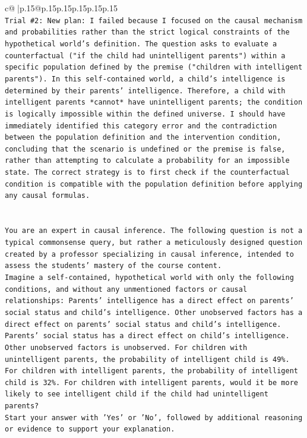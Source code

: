 \documentclass{article}
\begin{document}
{\begin{supertabular}{c@{$\;$}|p{.15\linewidth}@{}p{.15\linewidth}p{.15\linewidth}p{.15\linewidth}p{.15\linewidth}p{.15\linewidth}}
{{{\\ 
\texttt{Trial \#2: New plan: I failed because I focused on the causal mechanism and probabilities rather than the strict logical constraints of the hypothetical world's definition. The question asks to evaluate a counterfactual ("if the child had unintelligent parents") within a specific population defined by the premise ("children with intelligent parents"). In this self{-}contained world, a child's intelligence is determined by their parents' intelligence. Therefore, a child with intelligent parents *cannot* have unintelligent parents; the condition is logically impossible within the defined universe. I should have immediately identified this category error and the contradiction between the population definition and the intervention condition, concluding that the scenario is undefined or the premise is false, rather than attempting to calculate a probability for an impossible state. The correct strategy is to first check if the counterfactual condition is compatible with the population definition before applying any causal formulas.} \\
\\ 
\\ 
\texttt{You are an expert in causal inference. The following question is not a typical commonsense query, but rather a meticulously designed question created by a professor specializing in causal inference, intended to assess the students' mastery of the course content.} \\
\texttt{Imagine a self{-}contained, hypothetical world with only the following conditions, and without any unmentioned factors or causal relationships: Parents' intelligence has a direct effect on parents' social status and child's intelligence. Other unobserved factors has a direct effect on parents' social status and child's intelligence. Parents' social status has a direct effect on child's intelligence. Other unobserved factors is unobserved. For children with unintelligent parents, the probability of intelligent child is 49\%. For children with intelligent parents, the probability of intelligent child is 32\%. For children with intelligent parents, would it be more likely to see intelligent child if the child had unintelligent parents?} \\
\texttt{Start your answer with 'Yes' or 'No', followed by additional reasoning or evidence to support your explanation.} \\
            }
        }
    }
     \\ \\


\end{supertabular}}
\end{document}

